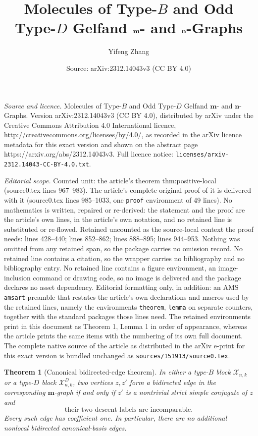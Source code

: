 \documentclass[10pt,a4paper]{amsart}
\title{Molecules of Type-$B$ and Odd Type-$D$ Gelfand $\mgraph$- and $\ngraph$-Graphs}
\author{Yifeng Zhang}
\date{Source: arXiv:2312.14043v3 (CC BY 4.0)}
\newcommand{\ngraph}{\mathbf n}
\newtheorem{theorem}{Theorem}
\newcommand{\cX}{\mathcal X}
\newcommand{\mgraph}{\mathbf m}
\begin{document}
\maketitle

\noindent\emph{Source and licence.} Molecules of Type-$B$ and Odd Type-$D$ Gelfand $\mgraph$- and $\ngraph$-Graphs. Version arXiv:2312.14043v3 (CC BY 4.0), distributed by arXiv under the Creative Commons Attribution 4.0 International licence, http://creativecommons.org/licenses/by/4.0/, as recorded in the arXiv licence metadata for this exact version and shown on the abstract page https://arxiv.org/abs/2312.14043v3. Full licence notice: \texttt{licenses/arxiv-2312.14043-CC-BY-4.0.txt}.\par\smallskip

\noindent\textit{Editorial scope.} Counted unit: the article's theorem thm:positive-local (source0.tex lines 967--983). The article's complete original proof of it is delivered with it (source0.tex lines 985--1033, one \texttt{proof} environment of 49 lines). No mathematics is written, repaired or re-derived: the statement and the proof are the article's own lines, in the article's own notation, and no retained line is substituted or re-flowed.  Retained uncounted as the source-local context the proof needs: lines 428--440; lines 852--862; lines 888--895; lines 944--953.  Nothing was omitted from any retained span, so the package carries no omission record.  No retained line contains a citation, so the wrapper carries no bibliography and no bibliography entry.  No retained line contains a figure environment, an image-inclusion command or drawing code, so no image is delivered and the package declares no asset dependency.  Editorial formatting only, in addition: an AMS \texttt{amsart} preamble that restates the article's own declarations and macros used by the retained lines, namely the environments \texttt{theorem}, \texttt{lemma} on separate counters, together with the standard packages those lines need.  The retained environments print in this document as Theorem 1, Lemma 1 in order of appearance, whereas the article prints the same items with the numbering of its own full document.  The complete native source of the article as distributed in the arXiv e-print for this exact version is bundled unchanged as \texttt{sources/151913/source0.tex}.
\begin{theorem}[Canonical bidirected-edge theorem]
\label{thm:all-edges}
In either a type-$B$ block $\cX_{n,k}$ or a type-$D$ block
$\cX^D_{n,k}$, two vertices $z,z'$ form a bidirected edge in the
corresponding $\mgraph$-graph if and only if $z'$ is a nontrivial strict
simple conjugate of $z$ and
\begin{equation}
 \text{their two descent labels are incomparable}.
\label{eq:strict-edge}
\end{equation}
Every such edge has coefficient one.  In particular, there are no
additional nonlocal bidirected canonical-basis edges.
\end{theorem}
\end{document}
